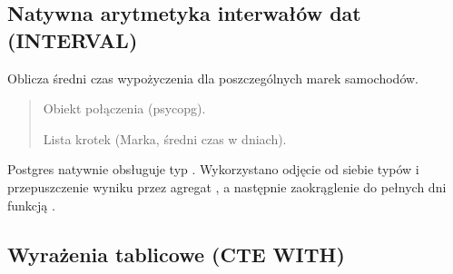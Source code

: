\documentclass[a4paper,11pt,english,openany,oneside]{sphinxmanual}
\begin{document}
\subsection{Natywna arytmetyka interwałów dat (INTERVAL)}
\label{\detokenize{rozdzial_5/index:natywna-arytmetyka-interwalow-dat-interval}}

\begin{savenotes}\begin{fulllineitems}

\pysigstartsignatures
\pysiglinewithargsret
{}
{}
{}
\pysigstopsignatures
\sphinxAtStartPar
Oblicza średni czas wypożyczenia dla poszczególnych marek samochodów.
\begin{quote}\begin{description}
\sphinxAtStartPar
{} \textendash{} Obiekt połączenia (psycopg).

\sphinxAtStartPar
Lista krotek (Marka, średni czas w dniach).

\end{description}\end{quote}

\sphinxAtStartPar
{} Postgres natywnie obsługuje typ . Wykorzystano odjęcie od siebie typów  i przepuszczenie wyniku przez agregat , a następnie zaokrąglenie do pełnych dni funkcją .

\end{fulllineitems}\end{savenotes}



\subsection{Wyrażenia tablicowe (CTE \sphinxhyphen{} WITH)}
\label{\detokenize{rozdzial_5/index:wyrazenia-tablicowe-cte-with}}
\end{document}
